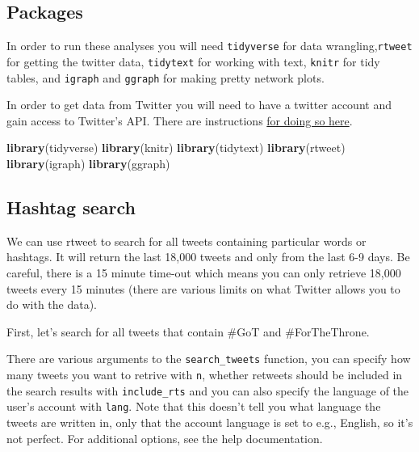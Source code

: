 \documentclass[]{book}
\newenvironment{Shaded}{\begin{snugshade}}{\end{snugshade}}
\newcommand{\KeywordTok}[1]{\textcolor[rgb]{0.13,0.29,0.53}{\textbf{#1}}}
\newcommand{\NormalTok}[1]{#1}
\begin{document}
\hypertarget{packages-1}{%
\subsection{Packages}\label{packages-1}}

In order to run these analyses you will need \texttt{tidyverse} for data wrangling,\texttt{rtweet} for getting the twitter data, \texttt{tidytext} for working with text, \texttt{knitr} for tidy tables, and \texttt{igraph} and \texttt{ggraph} for making pretty network plots.

In order to get data from Twitter you will need to have a twitter account and gain access to Twitter's API. There are instructions \href{https://rtweet.info/}{for doing so here}.

\begin{Shaded}
\begin{Highlighting}[]
\KeywordTok{library}\NormalTok{(tidyverse)}
\KeywordTok{library}\NormalTok{(knitr)}
\KeywordTok{library}\NormalTok{(tidytext)}
\KeywordTok{library}\NormalTok{(rtweet)}
\KeywordTok{library}\NormalTok{(igraph)}
\KeywordTok{library}\NormalTok{(ggraph)}
\end{Highlighting}
\end{Shaded}

\hypertarget{hashtag-search}{%
\subsection{Hashtag search}\label{hashtag-search}}

We can use rtweet to search for all tweets containing particular words or hashtags. It will return the last 18,000 tweets and only from the last 6-9 days. Be careful, there is a 15 minute time-out which means you can only retrieve 18,000 tweets every 15 minutes (there are various limits on what Twitter allows you to do with the data).

First, let's search for all tweets that contain \#GoT and \#ForTheThrone.

There are various arguments to the \texttt{search\_tweets} function, you can specify how many tweets you want to retrive with \texttt{n}, whether retweets should be included in the search results with \texttt{include\_rts} and you can also specify the language of the user's account with \texttt{lang}. Note that this doesn't tell you what language the tweets are written in, only that the account language is set to e.g., English, so it's not perfect. For additional options, see the help documentation.
\end{document}
